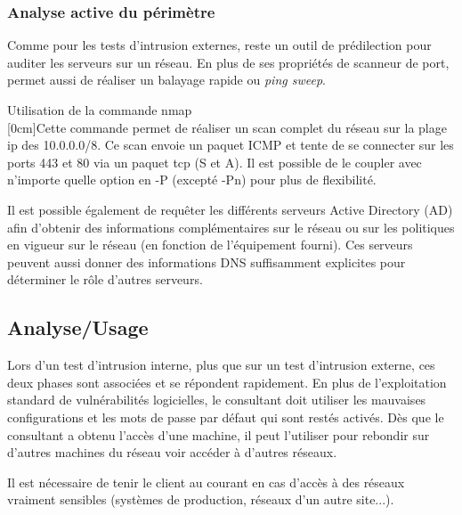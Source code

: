 \documentclass[twoside,a4paper,12pt,titlepage]{book}
\newcommand{\MarginPar}[2]{\marginnote{\scriptsize #1}[#2]}
\begin{document}
\subsubsection{Analyse active du périmètre}
	Comme pour les tests d'intrusion externes,  reste un outil de prédilection pour auditer les serveurs sur un réseau. En plus de ses propriétés de scanneur de port,  permet aussi de réaliser un balayage rapide ou \textit{ping sweep}.
\begin{FlagConsole}{Utilisation de la commande nmap}
	\\
	\tcblower
	\MarginPar{\textbf{Ping Sweep}}{0cm}Cette commande permet de réaliser un scan complet du réseau sur la plage ip des 10.0.0.0/8. Ce scan envoie un paquet ICMP et tente de se connecter sur les ports 443 et 80 via un paquet tcp (S et A). Il est possible de le coupler avec n'importe quelle option en -P (excepté -Pn) pour plus de flexibilité.
\end{FlagConsole}

Il est possible également de requêter les différents serveurs Active Directory (AD) afin d'obtenir des informations complémentaires sur le réseau ou sur les politiques en vigueur sur le réseau (en fonction de l'équipement fourni). Ces serveurs peuvent aussi donner des informations DNS suffisamment explicites pour déterminer le rôle d'autres serveurs.

\subsection{Analyse/Usage}
	Lors d'un test d'intrusion interne, plus que sur un test d'intrusion externe, ces deux phases sont associées et se répondent rapidement. En plus de l'exploitation standard de vulnérabilités logicielles, le consultant doit utiliser les mauvaises configurations et les mots de passe par défaut qui sont restés activés. Dès que le consultant a obtenu l'accès d'une machine, il peut l'utiliser pour rebondir sur d'autres machines du réseau voir accéder à d'autres réseaux.
	\begin{Warning}
		Il est nécessaire de tenir le client au courant en cas d'accès à des réseaux vraiment sensibles (systèmes de production, réseaux d'un autre site...).
	\end{Warning}
\end{document}
